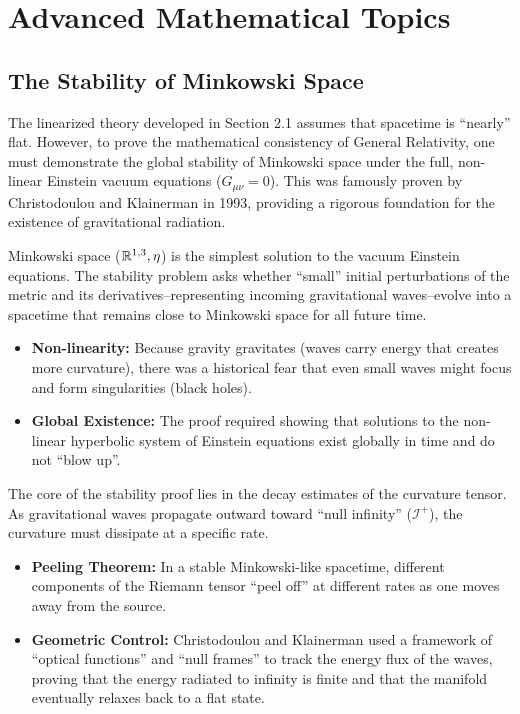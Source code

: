 \section{Advanced Mathematical Topics}
\label{sec:advanced_mathematical_topics}

\subsection{The Stability of Minkowski Space} The linearized theory developed in Section 2.1 assumes that spacetime is ``nearly'' flat. However, to prove the mathematical consistency of General Relativity, one must demonstrate the global stability of Minkowski space under the full, non-linear Einstein vacuum equations ($G_{\mu\nu} = 0$). This was famously proven by Christodoulou and Klainerman in 1993, providing a rigorous foundation for the existence of gravitational radiation.

Minkowski space ($\mathbb{R}^{1,3}, \eta$) is the simplest solution to the vacuum Einstein equations. The stability problem asks whether ``small'' initial perturbations of the metric and its derivatives--representing incoming gravitational waves--evolve into a spacetime that remains close to Minkowski space for all future time.
\begin{itemize}
  \item \textbf{Non-linearity:} Because gravity gravitates (waves carry energy that creates more curvature), there was a historical fear that even small waves might focus and form singularities (black holes).
  \item \textbf{Global Existence:} The proof required showing that solutions to the non-linear hyperbolic system of Einstein equations exist globally in time and do not ``blow up''.
\end{itemize}

The core of the stability proof lies in the decay estimates of the curvature tensor. As gravitational waves propagate outward toward ``null infinity'' ($\mathcal{I}^+$), the curvature must dissipate at a specific rate.
\begin{itemize}
  \item \textbf{Peeling Theorem:} In a stable Minkowski-like spacetime, different components of the Riemann tensor ``peel off'' at different rates as one moves away from the source.
  \item \textbf{Geometric Control:} Christodoulou and Klainerman used a framework of ``optical functions'' and ``null frames'' to track the energy flux of the waves, proving that the energy radiated to infinity is finite and that the manifold eventually relaxes back to a flat state.
\end{itemize}

